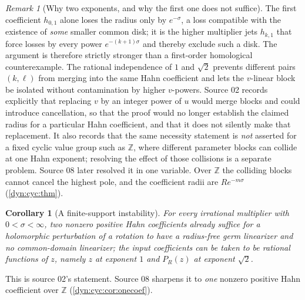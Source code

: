 \documentclass[11pt,letterpaper]{article}
\newtheorem{corollary}[corollary]{Corollary}
\theoremstyle{definition}
\theoremstyle{remark}
\newtheorem{remark}[remark]{Remark}
\newcommand{\Z}{\mathbb Z}
\numberwithin{equation}{section}
\begin{document}
\begin{remark}[Why two exponents, and why the first one does not suffice]
\label{dyn:rem:twoexponents}
The first coefficient $h_{0,1}$ alone loses the radius only by
$e^{-\sigma}$, a loss compatible with the existence of \emph{some} smaller
common disk; it is the higher multiplier jets $h_{k,1}$ that force losses
by every power $e^{-(k+1)\sigma}$ and thereby exclude such a disk. The
argument is therefore strictly stronger than a first-order homological
counterexample. The rational independence of $1$ and $\sqrt2$ prevents
different pairs $(k,\ell)$ from merging into the same Hahn coefficient and
lets the $v$-linear block be isolated without contamination by higher
$v$-powers. Source 02 records explicitly that replacing $v$ by an integer
power of $u$ would merge blocks and could introduce cancellation, so that
the proof would no longer establish the claimed radius for a particular
Hahn coefficient, and that it does not silently make that replacement. It
also records that the same necessity statement is \emph{not} asserted for a
fixed cyclic value group such as $\Z$, where different parameter blocks can
collide at one Hahn exponent; resolving the effect of those collisions is a
separate problem. Source 08 later resolved it in one variable. Over $\Z$ the
colliding blocks cannot cancel the highest pole, and the coefficient radii
are $Re^{-m\sigma}$ (\cref{dyn:cyc:thm}).
\end{remark}

\begin{corollary}[A finite-support instability]\label{dyn:cor:finitefailure}
For every irrational multiplier with $0<\sigma<\infty$, \emph{two} nonzero
positive Hahn coefficients already suffice for a holomorphic perturbation
of a rotation to have a radius-free germ linearizer and no common-domain
linearizer; the input coefficients can be taken to be rational functions of
$z$, namely $z$ at exponent $1$ and $P_R(z)$ at exponent $\sqrt2$.
\end{corollary}

This is source 02's statement. Source 08 sharpens it to \emph{one} nonzero
positive Hahn coefficient over $\Z$ (\cref{dyn:cyc:cor:onecoef}).
\end{document}
